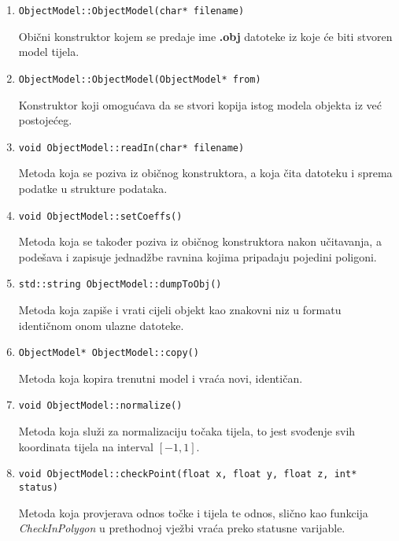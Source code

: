 \documentclass[utf8]{fer}
\begin{document}
\begin{enumerate}
\item \begin{lstlisting}
ObjectModel::ObjectModel(char* filename)
\end{lstlisting}
Obični konstruktor kojem se predaje ime \textbf{.obj} datoteke iz koje će biti stvoren model tijela.

\item \begin{lstlisting}
ObjectModel::ObjectModel(ObjectModel* from)
\end{lstlisting}

Konstruktor koji omogućava da se stvori kopija istog modela objekta iz već postojećeg.

\item \begin{lstlisting}
void ObjectModel::readIn(char* filename)
\end{lstlisting}

Metoda koja se poziva iz običnog konstruktora, a koja čita datoteku i sprema podatke u strukture podataka.


\item \begin{lstlisting}
void ObjectModel::setCoeffs()
\end{lstlisting}

Metoda koja se također poziva iz običnog konstruktora nakon učitavanja, a podešava i zapisuje jednadžbe ravnina kojima pripadaju pojedini poligoni.


\item \begin{lstlisting}
std::string ObjectModel::dumpToObj()
\end{lstlisting}

Metoda koja zapiše i vrati cijeli objekt kao znakovni niz u formatu identičnom onom ulazne datoteke.

\item \begin{lstlisting}
ObjectModel* ObjectModel::copy()
\end{lstlisting}

Metoda koja kopira trenutni model i vraća novi, identičan.

\item \begin{lstlisting}
void ObjectModel::normalize()
\end{lstlisting}

Metoda koja služi za normalizaciju točaka tijela, to jest svođenje svih koordinata tijela na interval $[-1,1]$.

\item \begin{lstlisting}
void ObjectModel::checkPoint(float x, float y, float z, int* status)
\end{lstlisting}

Metoda koja provjerava odnos točke i tijela te odnos, slično kao funkcija \textit{CheckInPolygon} u prethodnoj vježbi vraća preko statusne varijable.

\end{enumerate}
\end{document}
